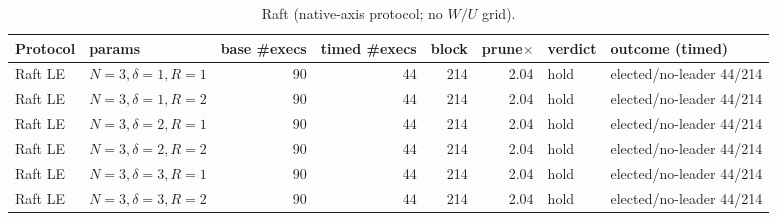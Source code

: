 \begin{table}[t]\centering
\caption{Raft (native-axis protocol; no $W/U$ grid).}
\begin{tabular}{llrrrrll}
\toprule
Protocol & params & base \#execs & timed \#execs & block & prune$\times$ & verdict & outcome (timed) \\
\midrule
Raft LE & $N{=}3,\delta{=}1,R{=}1$ & 90 & 44 & 214 & 2.04 & \textsf{hold} & elected/no-leader 44/214 \\
Raft LE & $N{=}3,\delta{=}1,R{=}2$ & 90 & 44 & 214 & 2.04 & \textsf{hold} & elected/no-leader 44/214 \\
Raft LE & $N{=}3,\delta{=}2,R{=}1$ & 90 & 44 & 214 & 2.04 & \textsf{hold} & elected/no-leader 44/214 \\
Raft LE & $N{=}3,\delta{=}2,R{=}2$ & 90 & 44 & 214 & 2.04 & \textsf{hold} & elected/no-leader 44/214 \\
Raft LE & $N{=}3,\delta{=}3,R{=}1$ & 90 & 44 & 214 & 2.04 & \textsf{hold} & elected/no-leader 44/214 \\
Raft LE & $N{=}3,\delta{=}3,R{=}2$ & 90 & 44 & 214 & 2.04 & \textsf{hold} & elected/no-leader 44/214 \\
\bottomrule
\end{tabular}
\end{table}